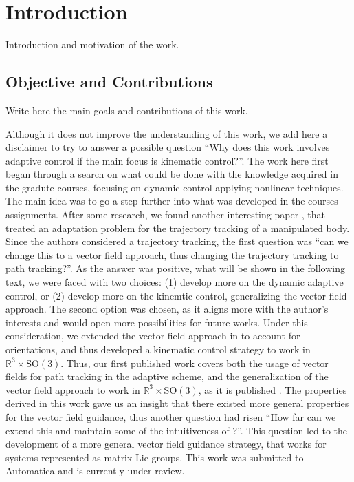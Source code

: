 \chapter{Introduction}\label{chap:Intro}

Introduction and motivation of the work.

\section{Objective and Contributions}

Write here the main goals and contributions of this work.

Although it does not improve the understanding of this work, we add here a disclaimer to try to answer a possible question ``Why does this work involves adaptive control if the main focus is kinematic control?''. The work here first began through a search on what could be done with the knowledge acquired in the gradute courses, focusing on dynamic control applying nonlinear techniques. The main idea was to go a step further into what was developed in the courses assignments. After some research, we found another interesting paper \citep{Culbertson2021}, that treated an adaptation problem for the trajectory tracking of a manipulated body. Since the authors considered a trajectory tracking, the first question was ``can we change this to a vector field approach, thus changing the trajectory tracking to path tracking?''. As the answer was positive, what will be shown in the following text, we were faced with two choices: (1) develop more on the dynamic adaptive control, or (2) develop more on the kinemtic control, generalizing the vector field approach. The second option was chosen, as it aligns more with the author's interests and would open more possibilities for future works. Under this consideration, we extended the vector field approach in \citet{Rezende2022} to account for orientations, and thus developed a kinematic control strategy to work in $\mathbb{R}^3\times\text{SO}(3)$. Thus, our first published work covers both the usage of vector fields for path tracking in the adaptive scheme, and the generalization of the vector field approach to work in $\mathbb{R}^3\times\text{SO}(3)$, as it is published \citep{Pessoa2024}. The properties derived in this work gave us an insight that there existed more general properties for the vector field guidance, thus another question had risen ``How far can we extend this and maintain some of the intuitiveness of \citet{Rezende2022}?''. This question led to the development of a more general vector field guidance strategy, that works for systems represented as matrix Lie groups. This work was submitted to Automatica and is currently under review.

